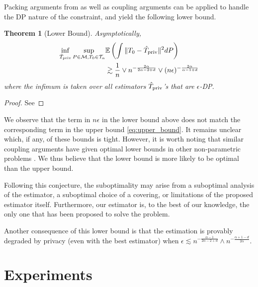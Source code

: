 \documentclass{article}
\theoremstyle{plain}
\newtheorem{theorem}{Theorem}[section]
\theoremstyle{definition}
\theoremstyle{remark}
\newcommand{\E}[0]{\mathbb{E}}
\newcommand\p[1]{\left( {#1}\right)}
\begin{document}
Packing arguments from \cite{hutter2021minimax} as well as coupling arguments \cite{acharya2018differentially,acharya2021differentially,lalanne2022statistical} can be applied to handle the DP nature of the constraint, and yield the following lower bound.

\begin{theorem}[Lower Bound]
\label{theorem:lowerbound}
Asymptotically,
\begin{equation}
\begin{aligned}
    \inf_{\hat{T}_{\text{\normalshape priv}}} \sup_{P \in \mathcal{M}, T_0 \in \mathcal{T}_{\alpha}}
   &\E\p{\int \| T_0 - \hat{T}_{\text{\normalshape priv}}  \|^2 dP} \\
   &\gtrsim  \frac{1}{n} \vee n^{- \frac{2 \alpha}{2 \alpha - 2 + d}} \vee (n\epsilon)^{- \frac{2 \alpha}{\alpha - 1 + d}}
\end{aligned}
\end{equation}
    where the infimum is taken over all estimators $\hat{T}_{\text{\normalshape priv}}$'s that are $\epsilon$-DP.
\end{theorem}
\begin{proof}
    See 
\end{proof}

We observe that the term in $n\epsilon$ in the lower bound above does not match the corresponding term in the upper bound \eqref{eq:upper_bound}. 
It remains unclear which, if any, of these bounds is tight. 
However, it is worth noting that similar coupling arguments have given optimal lower bounds in other non-parametric problems \cite{lalanne2023about,lalanne2024privatedensity}. We thus believe that the lower bound is more likely to be optimal than the upper bound. 

Following this conjecture, the suboptimality may arise from a suboptimal analysis of the estimator, a suboptimal choice of a covering, or limitations of the proposed estimator itself. Furthermore, our estimator is, to the best of our knowledge, the only one that has been proposed to solve the problem.

Another consequence of this lower bound is that the estimation is provably degraded by privacy (even with the best estimator) when $\epsilon \lesssim n^{- \frac{\alpha - 1}{2 \alpha - 2 + d}} \wedge n^{- \frac{\alpha +1 - d}{2 \alpha}}$. 

\section{Experiments}
\label{sec:experiments}
\end{document}
